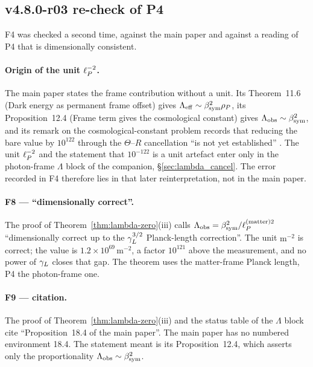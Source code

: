 \subsection*{v4.8.0-r03 re-check of P4}
\label{subsec:v480-r03-p4-recheck}

F4 was checked a second time, against the main paper and against a reading of P4 that is
dimensionally consistent.

\paragraph{Origin of the unit \(\ell_P^{-2}\).}
The main paper states the frame contribution without a unit.  Its Theorem~11.6 (Dark energy as
permanent frame offset) gives \(\Lambda_{\mathrm{eff}}\sim\beta_{\mathrm{sym}}^2\rho_P\), its Proposition~12.4
(Frame term gives the cosmological constant) gives \(\Lambda_{\mathrm{obs}}\sim\beta_{\mathrm{sym}}^2\), and its
remark on the cosmological-constant problem records that reducing the bare value by
\(10^{122}\) through the \(\Theta\)--\(R\) cancellation ``is not yet established''
\cite{brendecke2026main}.  The unit \(\ell_P^{-2}\) and the statement that \(10^{-122}\) is a unit
artefact enter only in the photon-frame \(\Lambda\) block of the companion,
\S\ref{sec:lambda_cancel}.  The error recorded in F4 therefore lies in that later
reinterpretation, not in the main paper.

\paragraph{F8 --- ``dimensionally correct''.}
The proof of Theorem~\ref{thm:lambda-zero}(iii) calls \(\Lambda_{\mathrm{obs}}=\beta_{\mathrm{sym}}^2/\ell_P^{(\mathrm{matter})2}\)
``dimensionally correct up to the \(\gamma_L^{3/2}\) Planck-length correction''.  The unit
\(\mathrm{m}^{-2}\) is correct; the value is \(1.2\times10^{69}\,\mathrm{m}^{-2}\), a factor
\(10^{121}\) above the measurement, and no power of \(\gamma_L\) closes that gap.  The theorem uses the
matter-frame Planck length, P4 the photon-frame one.

\paragraph{F9 --- citation.}
The proof of Theorem~\ref{thm:lambda-zero}(iii) and the status table of the \(\Lambda\) block cite
``Proposition~18.4 of the main paper''.  The main paper has no numbered environment 18.4.  The
statement meant is its Proposition~12.4, which asserts only the proportionality
\(\Lambda_{\mathrm{obs}}\sim\beta_{\mathrm{sym}}^2\).

